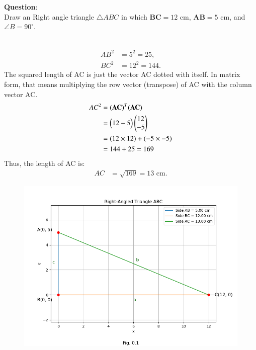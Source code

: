 \documentclass[journal]{IEEEtran}
\begin{document}
\textbf{Question}:\\
Draw an Right angle  triangle $\triangle ABC$ in which $\boldsymbol{BC} = 12 \text{ cm}$, $\boldsymbol{AB} = 5 \text{ cm}$, and $\angle B = 90^\circ$.
\\ \solution \\
    \begin{table}[h!]    
      \centering
      
      \caption{}
    \end{table}
   \begin{align}
      AB^2 & = 5^2 = 25, \\
      BC^2 & = 12^2 = 144.
   \end{align}
   The squared length of AC is just the vector AC dotted with itself. In matrix form, that means multiplying the row vector (transpose) of AC with the column vector AC.
   \begin{align}
    AC^2 &= (\mathbf{AC})^T (\mathbf{AC}) \\
         &= \begin{pmatrix}12 -5\end{pmatrix} \begin{pmatrix}12 \\ -5\end{pmatrix} \\
         &= (12 \times 12) + (-5 \times -5) \\
         &= 144 + 25 = 169
\end{align}
Thus, the length of AC is:
\begin{align}
    AC &= \sqrt{169} = 13 \text{ cm}.
\end{align}
    \begin{figure}[h]
       \centering
       \includegraphics[width=0.9\columnwidth]{figs/fig1.png}
       \caption{}
       \label{graph}
    \end{figure}
\end{document}
